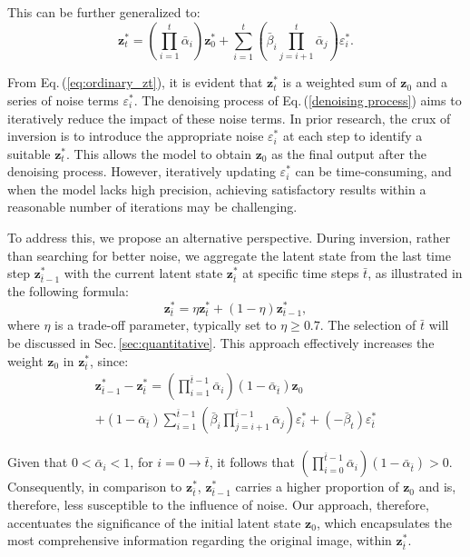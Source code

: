 \documentclass[letterpaper]{article} \usepackage{aaai25}  \usepackage{times}  \usepackage{helvet}  \usepackage{courier}  \usepackage[hyphens]{url}  \usepackage{graphicx} \urlstyle{rm} \def\UrlFont{\rm}  \usepackage{natbib}  \usepackage{caption} \frenchspacing  \setlength{\pdfpagewidth}{8.5in} \setlength{\pdfpageheight}{11in} \usepackage{algorithm}
\begin{document}
This can be further generalized to:
\begin{equation}\label{eq:ordinary_zt}
\mathbf{z}^*_{t} = (\prod_{i=1}^{t}\bar\alpha_i)\mathbf{z}^*_{0} + \sum_{i=1}^{t}(\bar\beta_i\prod_{j = i+1}^{t}\bar\alpha_j)\varepsilon^*_i.
\end{equation}



From Eq.\,(\ref{eq:ordinary_zt}), it is evident that $\mathbf{z}^*_{t}$ is a weighted sum of $\mathbf{z}_{0}$ and a series of noise terms $\varepsilon^*_i$. The denoising process of Eq.\,(\ref{denoising process}) aims to iteratively reduce the impact of these noise terms. In prior research, the crux of inversion is to introduce the appropriate noise $\varepsilon^*_i$ at each step to identify a suitable $\mathbf{z}^*_{t}$. This allows the model to obtain $\mathbf{z}_{0}$ as the final output after the denoising process. However, iteratively updating $\varepsilon^*_i$ can be time-consuming, and when the model lacks high precision,  achieving satisfactory results within a reasonable number of iterations may be challenging.


To address this, we propose an alternative perspective. During inversion, rather than searching for better noise, we aggregate the latent state from the last time step $\mathbf{z}^*_{\bar{t}-1}$ with the current latent state $\mathbf{z}^*_{\bar{t}}$ at specific time steps $\bar{t}$, as illustrated in the following formula:
\begin{equation}\label{eq:inject}
\mathbf{z}^*_{\bar{t}}=\eta  \mathbf{z}^*_{\bar{t}} + (1-\eta)  \mathbf{z}^*_{{\bar{t}-1}},
\end{equation}
where $\eta$ is a trade-off parameter, typically set to $\eta \geq 0.7$. The selection of $\bar{t}$ will be discussed in Sec.\,\ref{sec:quantitative}. This approach effectively increases the weight $\mathbf{z}_{0}$ in $\mathbf{z}^*_{\bar{t}}$, since:
\begin{equation}\label{eq:prove}
\begin{split}
\mathbf{z}^*_{{\bar{t}-1}} - \mathbf{z}^*_{\bar{t}} = (\prod_{i=1}^{\bar{t}-1}\bar\alpha_i)(1 - \bar\alpha_{\bar{t}})\mathbf{z}_{0} \\+ (1 - \bar\alpha_{\bar{t}})\sum_{i=1}^{\bar{t}-1}(\bar\beta_i\prod_{j = i+1}^{\bar{t}-1}\bar\alpha_j)\varepsilon^*_i + (-\bar\beta_{t})\varepsilon^*_{\bar{t}}
\end{split}
\end{equation}


Given that $0 < \bar\alpha_i < 1$, for $ i = 0 \rightarrow \bar{t}$, it follows that $(\prod_{i=0}^{\bar{t}-1}\bar\alpha_i)(1 - \bar\alpha_{\bar{t}}) > 0$. Consequently, in comparison to \(\mathbf{z}^*_{\bar{t}}\), \(\mathbf{z}^*_{\bar{t}-1}\) carries a higher proportion of \(\mathbf{z}_0\) and is, therefore, less susceptible to the influence of noise. Our approach, therefore, accentuates the significance of the initial latent state \(\mathbf{z}_0\), which encapsulates the most comprehensive information regarding the original image, within \(\mathbf{z}^*_{\bar{t}}\).
\end{document}
